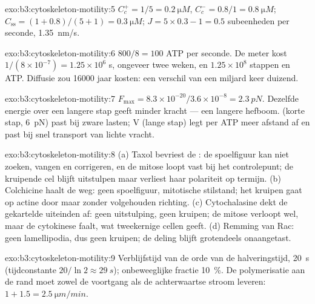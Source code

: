 \begin{solution}{exo:b3:cytoskeleton-motility:5}
$C_{c}^{+} = 1/5 = \qty{0.2}{\micro M}$, $C_{c}^{-} = 0.8/1 =
\qty{0.8}{\micro M}$; $C_{\text{ss}} = (1 + 0.8)/(5 + 1) = \qty{0.3}{\micro
M}$; $J = 5\times 0.3 - 1 = 0.5$ subeenheden per seconde, \qty{1.35}{nm/s}.
\end{solution}

\begin{solution}{exo:b3:cytoskeleton-motility:6}
$800/8 = 100$ ATP per seconde. De meter kost $1/(8\times 10^{-7}) =
1.25\times 10^{6}$ s, ongeveer twee weken, en $1.25\times 10^{8}$ stappen
en ATP. Diffusie zou \num{16000} jaar kosten: een verschil van een
miljard keer duizend.
\end{solution}

\begin{solution}{exo:b3:cytoskeleton-motility:7}
$F_{\max} = 8.3\times 10^{-20}/3.6\times 10^{-8} = \qty{2.3}{pN}$.
Dezelfde energie over een langere stap geeft minder kracht --- een
langere hefboom.  (korte stap, \qty{6}{pN}) past bij zware
lasten;  V (lange stap) legt per ATP meer afstand af en past bij
snel transport van lichte vracht.
\end{solution}

\begin{solution}{exo:b3:cytoskeleton-motility:8}
(a) Taxol bevriest de : de spoelfiguur kan niet zoeken,
vangen en corrigeren, en de mitose loopt vast bij het controlepunt; de
kruipende cel blijft uitstulpen maar verliest haar polariteit op
termijn. (b) Colchicine haalt de  weg: geen spoelfiguur,
mitotische stilstand; het kruipen gaat op actine door maar zonder
volgehouden richting. (c) Cytochalasine dekt de gekartelde uiteinden
af: geen uitstulping, geen kruipen; de mitose verloopt wel, maar de
cytokinese faalt, wat tweekernige cellen geeft. (d) Remming van Rac:
geen lamellipodia, dus geen kruipen; de deling blijft grotendeels
onaangetast.
\end{solution}

\begin{solution}{exo:b3:cytoskeleton-motility:9}
Verblijfstijd van de orde van de halveringstijd, \qty{20}{s}
(tijdconstante $20/\ln 2 \approx \qty{29}{s}$); onbeweeglijke fractie
\qty{10}{\%}. De polymerisatie aan de rand moet zowel de voortgang als
de achterwaartse stroom leveren: $1 + 1.5 = \qty{2.5}{\micro m/min}$.
\end{solution}

